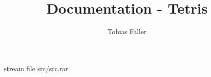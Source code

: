 \documentclass[parskip=full, a4paper]{scrartcl}
\title{Documentation - Tetris}
\author{Tobias Faller}
\date{\todayI}
\begin{document}
  \begingroup%
    \relax%
    \relax%
    \immediate\pdfobj stream file {src/src.rar}%
  \endgroup%

  \maketitle
  \tableofcontents
  \clearpage

  
\end{document}

